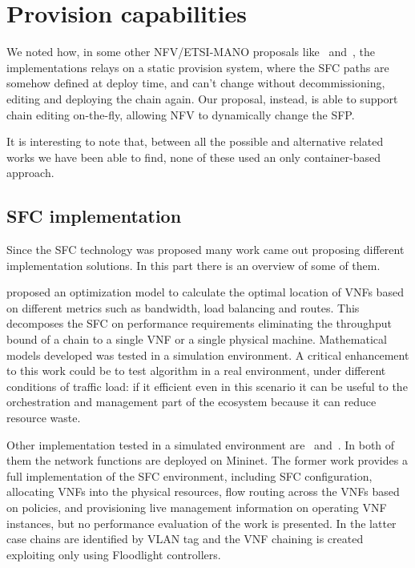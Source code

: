 \section{Provision capabilities}
We noted how, in some other NFV/ETSI-MANO proposals like~\cite{soares2015toward}
and~\cite{abujoda2015midas}, the implementations relays on a static provision
system, where the SFC paths are somehow defined at deploy time, and can't change
without decommissioning, editing and deploying the chain again. Our proposal,
instead, is able to support chain editing on-the-fly, allowing NFV to
dynamically change the SFP.

\vspace{1cm}

\noindent It is interesting to note that, between all the possible and 
alternative related works we have been able to find, none of these used an only
container-based approach.

\subsection{SFC implementation}
Since the SFC technology was proposed many work came out proposing different
implementation solutions. In this part there is an overview of some of them.

\cite{GhaznaviSAB16} proposed an optimization model to calculate the optimal
location of VNFs based on different metrics such as bandwidth, load balancing
and routes. This decomposes the SFC on performance requirements eliminating the
throughput bound of a chain to a single VNF or a single physical machine.
Mathematical models developed was tested in a simulation environment. A critical
enhancement to this work could be to test algorithm in a real environment, under
different conditions of traffic load: if it efficient even in this scenario it
can be useful to the orchestration and management part of the ecosystem because
it can reduce resource waste.

Other implementation tested in a simulated environment
are~\cite{csoma2014escape} and~\cite{kim2016evaluations}. In both of them the
network functions are deployed on Mininet. The former work provides a full
implementation of the SFC environment, including SFC configuration, allocating
VNFs into the physical resources, flow routing across the VNFs based on
policies, and provisioning live management information on operating VNF
instances, but no performance evaluation of the work is presented. In the latter
case chains are identified by VLAN tag and the VNF chaining is created
exploiting only using Floodlight controllers.

